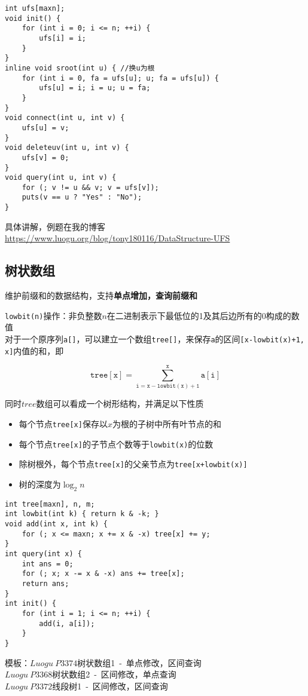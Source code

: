 \documentclass[UTF8]{ctexart}
\begin{document}
\begin{lstlisting}
int ufs[maxn];
void init() {
    for (int i = 0; i <= n; ++i) {
        ufs[i] = i;
    }
}
inline void sroot(int u) { //换u为根
    for (int i = 0, fa = ufs[u]; u; fa = ufs[u]) {
        ufs[u] = i; i = u; u = fa;
    }
}
void connect(int u, int v) {
    ufs[u] = v;
}
void deleteuv(int u, int v) {
    ufs[v] = 0;
}
void query(int u, int v) {
    for (; v != u && v; v = ufs[v]);
    puts(v == u ? "Yes" : "No");
}
\end{lstlisting}

具体讲解，例题在我的博客\url{https://www.luogu.org/blog/tony180116/DataStructure-UFS}

\subsection{树状数组}

维护前缀和的数据结构，支持\textbf{单点增加，查询前缀和}

\texttt{lowbit(n)}操作：非负整数$n$在二进制表示下最低位的1及其后边所有的0构成的数值\\

对于一个原序列\texttt{a[]}，可以建立一个数组\texttt{tree[]}，来保存\texttt{a}的区间\texttt{[x-lowbit(x)+1, x]}内值的和，即

\[\mathtt{tree[x] = \sum_{i=x-lowbit(x)+1}^x{a[i]}}\]

同时$tree$数组可以看成一个树形结构，并满足以下性质

\begin{itemize}
	\item 每个节点\texttt{tree[x]}保存以$x$为根的子树中所有叶节点的和
	\item 每个节点\texttt{tree[x]}的子节点个数等于\texttt{lowbit(x)}的位数
	\item 除树根外，每个节点\texttt{tree[x]}的父亲节点为\texttt{tree[x+lowbit(x)]}
	\item 树的深度为$\log_2n$ 
\end{itemize}

\begin{lstlisting}
int tree[maxn], n, m;
int lowbit(int k) { return k & -k; }
void add(int x, int k) {
    for (; x <= maxn; x += x & -x) tree[x] += y;
}
int query(int x) {
    int ans = 0;
    for (; x; x -= x & -x) ans += tree[x];
    return ans;
}
int init() {
    for (int i = 1; i <= n; ++i) {
        add(i, a[i]);
    }
}
\end{lstlisting}

模板：$Luogu\ P3374$树状数组1\ -\ 单点修改，区间查询\\
$Luogu\ P3368$树状数组2\ -\ 区间修改，单点查询\\
$Luogu\ P3372$线段树1\ -\ 区间修改，区间查询
\end{document}
